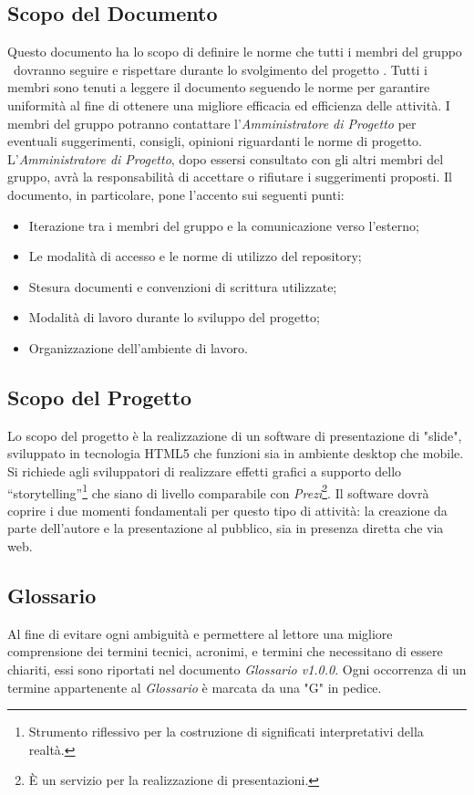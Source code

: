\subsection{Scopo del Documento}
Questo documento ha lo scopo di definire le norme che tutti i membri del gruppo \GRUPPO\ dovranno seguire e rispettare durante lo svolgimento del progetto \PROGETTO. Tutti i membri sono tenuti a leggere il documento seguendo le norme per garantire uniformità al fine di ottenere una migliore efficacia ed efficienza delle attività.
I membri del gruppo potranno contattare l'\textit{Amministratore di Progetto} per eventuali suggerimenti, consigli, opinioni riguardanti le norme di progetto. 
L'\textit{Amministratore di Progetto}, dopo essersi consultato con gli altri membri del gruppo, avrà la responsabilità di accettare o rifiutare i suggerimenti proposti. 
Il documento, in particolare, pone l'accento sui seguenti punti:

\begin{itemize}
	\item Iterazione tra i membri del gruppo e la comunicazione verso l'esterno;
	\item Le modalità di accesso e le norme di utilizzo del repository;
	\item Stesura documenti e convenzioni di scrittura utilizzate;
	\item Modalità di lavoro durante lo sviluppo del progetto;
	\item Organizzazione dell'ambiente di lavoro.
\end{itemize}

\subsection{Scopo del Progetto}
Lo scopo del progetto è la realizzazione di un software di presentazione di "slide", sviluppato in tecnologia HTML5 che funzioni sia in ambiente desktop che mobile.
Si richiede agli sviluppatori di realizzare effetti grafici a supporto dello “storytelling”\footnote{Strumento riflessivo per la costruzione di significati interpretativi della realtà.} che siano di livello comparabile con \textit{Prezi}\footnote{È un servizio per la realizzazione di presentazioni.}.
Il software dovrà coprire i due momenti fondamentali per questo tipo di attività: la creazione da parte dell'autore e la presentazione al pubblico, sia in presenza diretta che via web.

\subsection{Glossario}
Al fine di evitare ogni ambiguità e permettere al lettore una migliore comprensione dei termini tecnici, acronimi, e termini che necessitano di essere chiariti,  essi sono riportati nel documento \textit{Glossario v1.0.0}. 
Ogni occorrenza  di un termine appartenente al \textit{Glossario} è marcata da una "G" in pedice.


